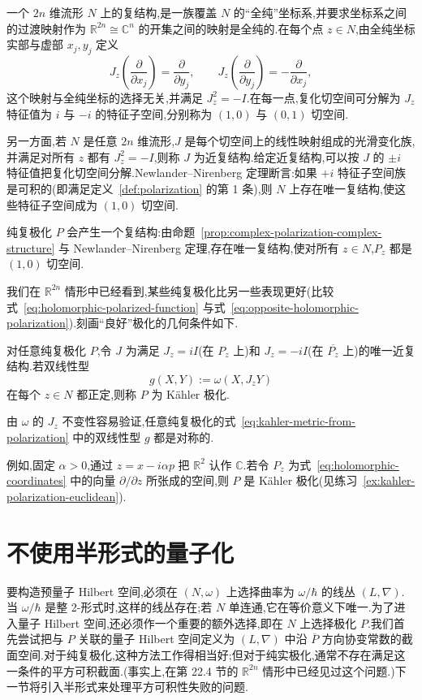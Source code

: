 一个 $2n$ 维流形 $N$ 上的复结构,是一族覆盖 $N$ 的“全纯”坐标系,并要求坐标系之间的过渡映射作为 $\mathbb R^{2n}\cong\mathbb C^n$ 的开集之间的映射是全纯的.在每个点 $z\in N$,由全纯坐标实部与虚部 $x_j,y_j$ 定义
\[
 J_z\left(\frac{\partial}{\partial x_j}\right)=\frac{\partial}{\partial y_j},
 \qquad
 J_z\left(\frac{\partial}{\partial y_j}\right)=-\frac{\partial}{\partial x_j},
\]
这个映射与全纯坐标的选择无关,并满足 $J_z^2=-I$.在每一点,复化切空间可分解为 $J_z$ 特征值为 $i$ 与 $-i$ 的特征子空间,分别称为 $(1,0)$ 与 $(0,1)$ 切空间.

另一方面,若 $N$ 是任意 $2n$ 维流形,$J$ 是每个切空间上的线性映射组成的光滑变化族,并满足对所有 $z$ 都有 $J_z^2=-I$,则称 $J$ 为近复结构.给定近复结构,可以按 $J$ 的 $\pm i$ 特征值把复化切空间分解.Newlander--Nirenberg 定理断言:如果 $+i$ 特征子空间族是可积的(即满足定义~\ref{def:polarization} 的第 1 条),则 $N$ 上存在唯一复结构,使这些特征子空间成为 $(1,0)$ 切空间.

纯复极化 $P$ 会产生一个复结构:由命题~\ref{prop:complex-polarization-complex-structure} 与 Newlander--Nirenberg 定理,存在唯一复结构,使对所有 $z\in N$,$P_z$ 都是 $(1,0)$ 切空间.

我们在 $\mathbb R^{2n}$ 情形中已经看到,某些纯复极化比另一些表现更好(比较式~\eqref{eq:holomorphic-polarized-function} 与式~\eqref{eq:opposite-holomorphic-polarization}).刻画“良好”极化的几何条件如下.

\begin{definition}[Kähler 极化]
\label{def:kahler-polarization}
对任意纯复极化 $P$,令 $J$ 为满足 $J_z=iI$(在 $P_z$ 上)和 $J_z=-iI$(在 $\overline{P_z}$ 上)的唯一近复结构.若双线性型
\[
 g(X,Y):=\omega(X,J_zY)
 \label{eq:kahler-metric-from-polarization}
\]
在每个 $z\in N$ 都正定,则称 $P$ 为 Kähler 极化.
\end{definition}

由 $\omega$ 的 $J_z$ 不变性容易验证,任意纯复极化的式~\eqref{eq:kahler-metric-from-polarization} 中的双线性型 $g$ 都是对称的.

例如,固定 $\alpha>0$,通过 $z=x-i\alpha p$ 把 $\mathbb R^2$ 认作 $\mathbb C$.若令 $P_z$ 为式~\eqref{eq:holomorphic-coordinates} 中的向量 $\partial/\partial z$ 所张成的空间,则 $P$ 是 Kähler 极化(见练习~\ref{ex:kahler-polarization-euclidean}).

\section{不使用半形式的量子化}
\label{sec:quantization-without-half-forms}

要构造预量子 Hilbert 空间,必须在 $(N,\omega)$ 上选择曲率为 $\omega/\hbar$ 的线丛 $(L,\nabla)$.当 $\omega/\hbar$ 是整 2-形式时,这样的线丛存在;若 $N$ 单连通,它在等价意义下唯一.为了进入量子 Hilbert 空间,还必须作一个重要的额外选择,即在 $N$ 上选择极化 $P$.我们首先尝试把与 $P$ 关联的量子 Hilbert 空间定义为 $(L,\nabla)$ 中沿 $\overline P$ 方向协变常数的截面空间.对于纯复极化,这种方法工作得相当好;但对于纯实极化,通常不存在满足这一条件的平方可积截面.(事实上,在第 22.4 节的 $\mathbb R^{2n}$ 情形中已经见过这个问题.)下一节将引入半形式来处理平方可积性失败的问题.

